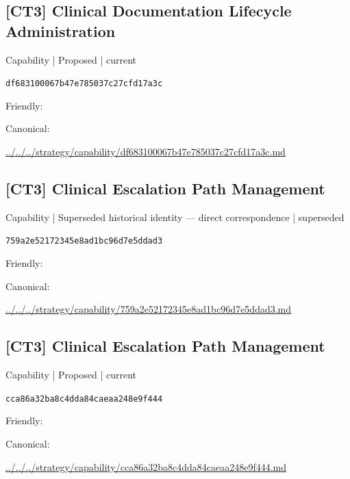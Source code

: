 \documentclass[10pt,a4paper]{article}
\begin{document}
\subsection*{[CT3] Clinical Documentation Lifecycle Administration}
{\small Capability | Proposed | current}\par
\texttt{df683100067b47e785037c27cfd17a3c}\par
Friendly: \par
Canonical: \par
{\footnotesize\url{../../../strategy/capability/df683100067b47e785037c27cfd17a3c.md}}\par
\subsection*{[CT3] Clinical Escalation Path Management}
{\small Capability | Superseded historical identity — direct correspondence | superseded}\par
\texttt{759a2e52172345e8ad1bc96d7e5ddad3}\par
Friendly: \par
Canonical: \par
{\footnotesize\url{../../../strategy/capability/759a2e52172345e8ad1bc96d7e5ddad3.md}}\par
\subsection*{[CT3] Clinical Escalation Path Management}
{\small Capability | Proposed | current}\par
\texttt{cca86a32ba8c4dda84caeaa248e9f444}\par
Friendly: \par
Canonical: \par
{\footnotesize\url{../../../strategy/capability/cca86a32ba8c4dda84caeaa248e9f444.md}}\par
\end{document}
